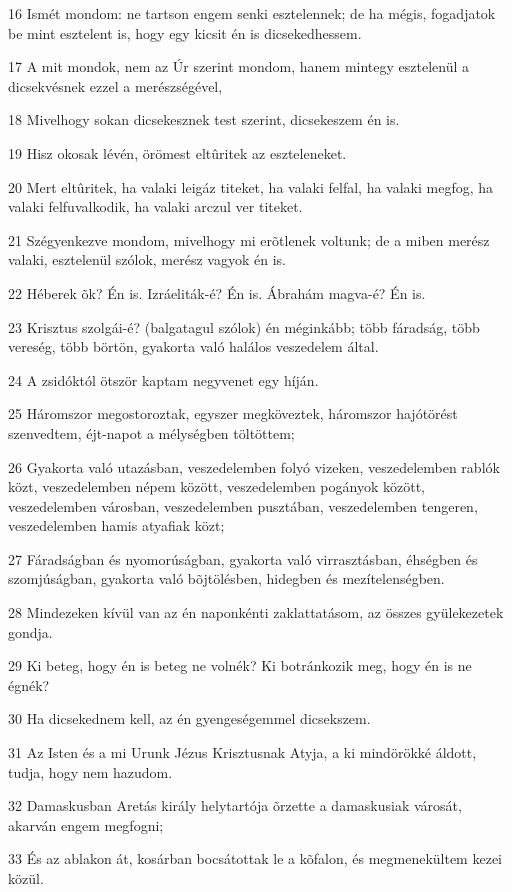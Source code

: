 \par 16 Ismét mondom: ne tartson engem senki esztelennek; de ha mégis, fogadjatok be mint esztelent is, hogy egy kicsit én is dicsekedhessem.
\par 17 A mit mondok, nem az Úr szerint mondom, hanem mintegy esztelenül a dicsekvésnek ezzel a merészségével,
\par 18 Mivelhogy sokan dicsekesznek test szerint, dicsekeszem  én is.
\par 19 Hisz okosak lévén, örömest eltûritek az eszteleneket.
\par 20 Mert eltûritek, ha valaki leigáz titeket, ha valaki felfal, ha valaki megfog, ha valaki felfuvalkodik, ha valaki arczul ver titeket.
\par 21 Szégyenkezve mondom, mivelhogy mi erõtlenek voltunk; de a miben merész valaki, esztelenül szólok, merész vagyok én is.
\par 22 Héberek õk? Én is. Izráeliták-é? Én is. Ábrahám magva-é? Én is.
\par 23 Krisztus szolgái-é? (balgatagul szólok) én méginkább; több fáradság, több vereség,  több börtön, gyakorta való halálos veszedelem által.
\par 24 A zsidóktól ötször kaptam negyvenet egy híján.
\par 25 Háromszor megostoroztak,  egyszer megköveztek, háromszor hajótörést szenvedtem, éjt-napot a mélységben töltöttem;
\par 26 Gyakorta való utazásban, veszedelemben folyó vizeken, veszedelemben rablók közt, veszedelemben népem között, veszedelemben pogányok között, veszedelemben városban, veszedelemben  pusztában, veszedelemben tengeren, veszedelemben hamis atyafiak közt;
\par 27 Fáradságban és nyomorúságban, gyakorta való virrasztásban, éhségben és szomjúságban, gyakorta való bõjtölésben, hidegben és mezítelenségben.
\par 28 Mindezeken kívül van az én naponkénti zaklattatásom, az összes gyülekezetek gondja.
\par 29 Ki beteg, hogy én is beteg ne volnék? Ki botránkozik meg, hogy én is ne égnék?
\par 30 Ha dicsekednem kell, az én gyengeségemmel dicsekszem.
\par 31 Az Isten és a mi Urunk Jézus Krisztusnak Atyja, a ki mindörökké áldott, tudja, hogy nem hazudom.
\par 32 Damaskusban Aretás király helytartója õrzette a damaskusiak városát, akarván engem megfogni;
\par 33 És az ablakon át, kosárban bocsátottak le a kõfalon, és megmenekültem kezei közül.

